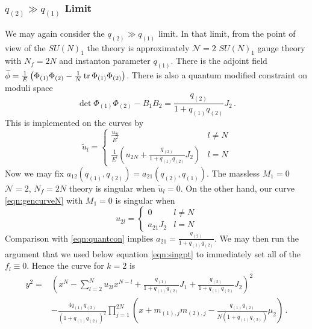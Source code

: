 \documentclass[main.tex]{subfiles}
\begin{document}
\subsubsection{$q_{(2)}\gg q_{(1)}$ Limit}
We may again consider the $q_{(2)}\gg q_{(1)}$ limit. In that limit, from the point of view of the $SU(N)_1$ the theory is approximately $\mathcal{N}=2$ $SU(N)_1$ gauge theory with $N_f=2N$ and instanton parameter $q_{(1)}$. There is the adjoint field $\widetilde{\phi}=\frac{1}{E}\left(\Phi_{(1)}\Phi_{(2)}-\frac{1}{N}\operatorname{tr}\Phi_{(1)}\Phi_{(2)}\right)$. There is also a quantum modified constraint on moduli space \cite{Seiberg:1994bz}
\begin{equation}\label{eqn:SeibergCons}
\det\Phi_{(1)}\Phi_{(2)}-B_1B_2=\frac{q_{(2)}}{1+q_{(1)}q_{(2)}}J_2\,.
\end{equation} 
This is implemented on the curves by
\begin{equation}\label{eqn:quantcon}
\widetilde{u}_l=\begin{cases}\frac{u_{2l}}{E^l}&l\neq N\\
\frac{1}{E^l}\left(u_{2N}+\frac{q_{(2)}}{1+q_{(1)}q_{(2)}}J_2\right)&l= N
\end{cases}
\end{equation}
Now we may fix $a_{12}(q_{(1)},q_{(2)})=a_{21}(q_{(2)},q_{(1)})$. The massless $M_1=0$ $\mathcal{N}=2$, $N_f=2N$ theory is singular when $\widetilde{u}_l=0$. On the other hand, our curve \eqref{eqn:gencurveN} with $M_1=0$ is singular when 
\begin{equation}
u_{2l}=\begin{cases}0&l\neq N\\
a_{21}J_2&l= N
\end{cases}
\end{equation}
Comparison with \eqref{eqn:quantcon} implies $a_{21}=\frac{q_{(2)}}{1+q_{(1)}q_{(2)}}$. We may then run the argument that we used below equation \eqref{eqn:singpt} to immediately set all of the $f_l\equiv0$. Hence the curve for $k=2$ is
\begin{equation}\label{eqn:curveN}
\begin{aligned}
y^2=&\left(x^N-\sum_{l=2}^Nu_{2l}x^{N-l}+\frac{q_{(1)}}{1+q_{(1)}q_{(2)}}J_1+\frac{q_{(2)}}{1+q_{(1)}q_{(2)}}J_2\right)^2\\
&-\frac{4q_{(1)}q_{(2)}}{(1+q_{(1)}q_{(2)})^2}\prod_{j=1}^{2N}\left(x+m_{(1),j}m_{(2),j}-\frac{q_{(1)}q_{(2)}}{N(1+q_{(1)}q_{(2)})}\mu_2\right)\,.
\end{aligned}
\end{equation}
\end{document}
